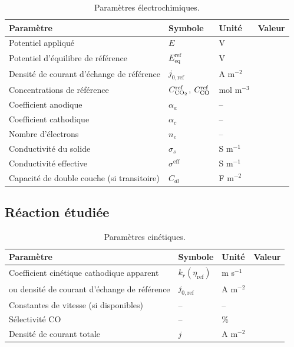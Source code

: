 \begin{table}[H]
\centering
\begin{tabular}{llll}
\hline
Paramètre & Symbole & Unité & Valeur \\
\hline
Potentiel appliqué & $E$ & V & \\
Potentiel d'équilibre de référence & $E_{\mathrm{eq}}^{\mathrm{ref}}$ & V & \\
Densité de courant d'échange de référence & $j_{0,\mathrm{ref}}$ & A m$^{-2}$ & \\
Concentrations de référence & $C_{\ce{CO2}}^{\mathrm{ref}}$, $C_{\ce{CO}}^{\mathrm{ref}}$ & mol m$^{-3}$ & \\
Coefficient anodique & $\alpha_a$ & -- & \\
Coefficient cathodique & $\alpha_c$ & -- & \\
Nombre d'électrons & $n_e$ & -- & \\
Conductivité du solide & $\sigma_s$ & S m$^{-1}$ & \\
Conductivité effective & $\sigma^{\mathrm{eff}}$ & S m$^{-1}$ & \\
Capacité de double couche (si transitoire) & $C_{dl}$ & F m$^{-2}$ & \\
\hline
\end{tabular}
\caption{Paramètres électrochimiques.}
\end{table}

\subsection{Réaction étudiée}

\begin{table}[H]
\centering
\begin{tabular}{llll}
\hline
Paramètre & Symbole & Unité & Valeur \\
\hline
Coefficient cinétique cathodique apparent & $k_r(\eta_{\mathrm{ref}})$ & m s$^{-1}$ & \\
ou densité de courant d'échange de référence & $j_{0,\mathrm{ref}}$ & A m$^{-2}$ & \\
Constantes de vitesse (si disponibles) & -- & -- & \\
Sélectivité CO & -- & \% & \\
Densité de courant totale & $j$ & A m$^{-2}$ & \\
\hline
\end{tabular}
\caption{Paramètres cinétiques.}
\end{table}

\vspace{0.5cm}